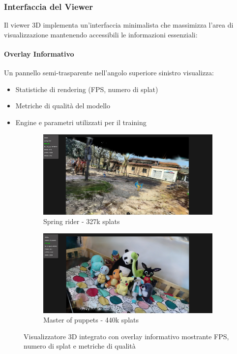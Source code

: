 \subsubsection{Interfaccia del Viewer}

Il viewer 3D implementa un'interfaccia minimalista che massimizza l'area di visualizzazione mantenendo accessibili le informazioni essenziali:

\paragraph{Overlay Informativo}
Un pannello semi-trasparente nell'angolo superiore sinistro visualizza:
\begin{itemize}
	\item Statistiche di rendering (FPS, numero di splat)
	\item Metriche di qualità del modello
	\item Engine e parametri utilizzati per il training
\end{itemize}

\begin{figure}[htbp]
	\centering
	\begin{subfigure}[b]{0.49\textwidth}
		\centering
		\includegraphics[width=\textwidth]{images/frontend_viewer.jpg}
		\caption{Spring rider - 327k splats}
	\end{subfigure}
	\hfill
	\begin{subfigure}[b]{0.49\textwidth}
		\centering
		\includegraphics[width=\textwidth]{images/frontend_viewer_2.jpg}
		\caption{Master of puppets - 440k splats}
	\end{subfigure}
	\caption{Visualizzatore 3D integrato con overlay informativo mostrante FPS, numero di splat e metriche di qualità}
	\label{fig:viewer3d_examples}
\end{figure}

